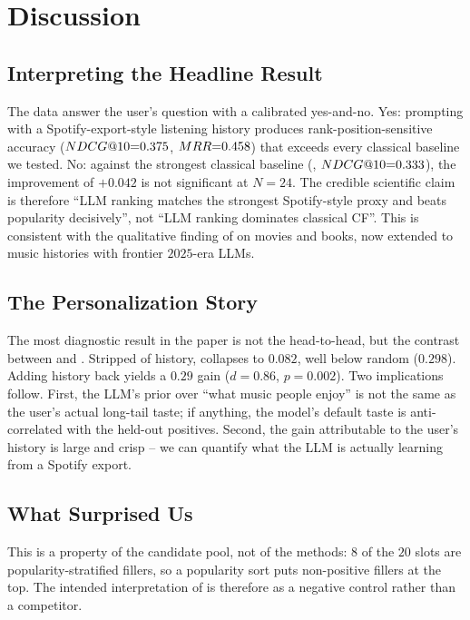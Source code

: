 \section{Discussion}
\label{sec:discussion}

\subsection{Interpreting the Headline Result}

The data answer the user's question with a calibrated yes-and-no. Yes: prompting \claude with a Spotify-export-style listening history produces rank-position-sensitive accuracy ($NDCG@10{=}0.375$, $MRR{=}0.458$) that exceeds every classical baseline we tested. No: against the strongest classical baseline (\cbf, $NDCG@10{=}0.333$), the improvement of $+0.042$ is not significant at $N{=}24$. The credible scientific claim is therefore ``LLM ranking matches the strongest Spotify-style proxy and beats popularity decisively'', not ``LLM ranking dominates classical CF''. This is consistent with the qualitative finding of \citet{hou2024llm} on movies and books, now extended to music histories with frontier $2025$-era LLMs.

\subsection{The Personalization Story}

The most diagnostic result in the paper is not the head-to-head, but the contrast between \claudehist and \claudenohist. Stripped of history, \claude collapses to \ndcg $0.082$, well below random ($0.298$). Adding history back yields a $0.29$ \ndcg gain ($d{=}0.86$, $p{=}0.002$). Two implications follow. First, the LLM's prior over ``what music people enjoy'' is not the same as the user's actual long-tail taste; if anything, the model's default taste is anti-correlated with the held-out positives. Second, the gain attributable to the user's history is large and crisp -- we can quantify what the LLM is actually learning from a Spotify export.

\subsection{What Surprised Us}

 This is a property of the candidate pool, not of the methods: $8$ of the $20$ slots are popularity-stratified fillers, so a popularity sort puts non-positive fillers at the top. The intended interpretation of \popmethod is therefore as a negative control rather than a competitor.


